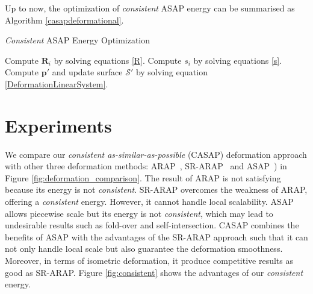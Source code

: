 Up to now, the optimization of \emph{consistent} ASAP energy can be summarised as Algorithm \eqref{casapdeformational}.
\begin{algorithm}[]
\caption{\emph{Consistent} ASAP Energy Optimization}
\label{casapdeformational}
\begin{algorithmic}[1]
        \State Compute $\mathbf R_i$ by solving equations \eqref{R}.
        \State Compute $s_i$ by solving equations \eqref{s}.
        \State Compute $\mathbf p'$ and update surface $\mathcal S'$ by solving equation \eqref{DeformationLinearSystem}.
    \EndWhile
\end{algorithmic}
\end{algorithm}

\section{Experiments}
We compare our \emph{consistent as-similar-as-possible} (CASAP) deformation approach with other three deformation methods: ARAP~\citep{sorkine2007rigid}, SR-ARAP~\citep{levi2015smooth} and ASAP~\citep{yamazaki2013non}) in Figure \ref{fig:deformation_comparison}. The result of ARAP is not satisfying because its energy is not \emph{consistent}. SR-ARAP overcomes the weakness of ARAP, offering a \emph{consistent} energy. However, it cannot handle local scalability. ASAP allows piecewise scale but its energy is not \emph{consistent}, which may lead to undesirable results such as fold-over and self-intersection. CASAP combines the benefits of ASAP with the advantages of the SR-ARAP approach such that it can not only handle local scale but also guarantee the deformation smoothness. Moreover, in terms of isometric deformation, it produce competitive results as good as SR-ARAP. Figure \ref{fig:consistent} shows the advantages of our \emph{consistent} energy.\\
